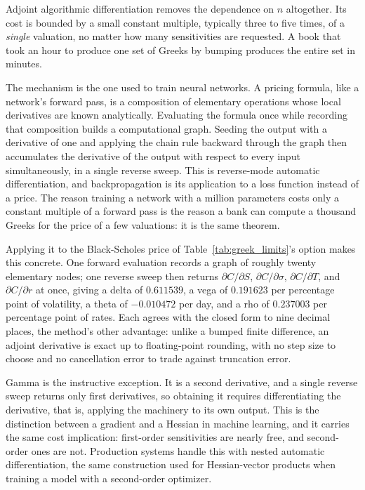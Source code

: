 \documentclass[../ai_in_finance]{subfiles}
\begin{document}
Adjoint algorithmic differentiation removes the dependence on $n$ altogether. Its cost is bounded by a small constant multiple, typically three to five times, of a \emph{single} valuation, no matter how many sensitivities are requested. A book that took an hour to produce one set of Greeks by bumping produces the entire set in minutes.

The mechanism is the one used to train neural networks. A pricing formula, like a network's forward pass, is a composition of elementary operations whose local derivatives are known analytically. Evaluating the formula once while recording that composition builds a computational graph. Seeding the output with a derivative of one and applying the chain rule backward through the graph then accumulates the derivative of the output with respect to every input simultaneously, in a single reverse sweep. This is reverse-mode automatic differentiation, and backpropagation is its application to a loss function instead of a price. The reason training a network with a million parameters costs only a constant multiple of a forward pass is the reason a bank can compute a thousand Greeks for the price of a few valuations: it is the same theorem.

Applying it to the Black-Scholes price of Table~\ref{tab:greek_limits}'s option makes this concrete. One forward evaluation records a graph of roughly twenty elementary nodes; one reverse sweep then returns $\partial C/\partial S$, $\partial C/\partial \sigma$, $\partial C/\partial T$, and $\partial C/\partial r$ at once, giving a delta of $0.611539$, a vega of $0.191623$ per percentage point of volatility, a theta of $-0.010472$ per day, and a rho of $0.237003$ per percentage point of rates. Each agrees with the closed form to nine decimal places, the method's other advantage: unlike a bumped finite difference, an adjoint derivative is exact up to floating-point rounding, with no step size to choose and no cancellation error to trade against truncation error.

Gamma is the instructive exception. It is a second derivative, and a single reverse sweep returns only first derivatives, so obtaining it requires differentiating the derivative, that is, applying the machinery to its own output. This is the distinction between a gradient and a Hessian in machine learning, and it carries the same cost implication: first-order sensitivities are nearly free, and second-order ones are not. Production systems handle this with nested automatic differentiation, the same construction used for Hessian-vector products when training a model with a second-order optimizer.
\end{document}
